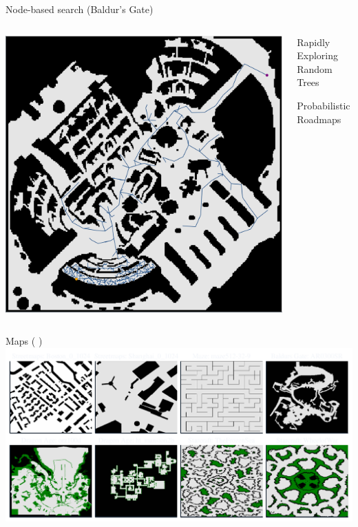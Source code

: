 \documentclass[aspectratio=169]{beamer}
\begin{document}
\begin{frame}[plain]{Node-based search (Baldur's Gate)}
  \begin{columns}[T]
      \begin{column}{.6\linewidth}
      \includegraphics[height=0.9\textheight, keepaspectratio]{figures/baldurs_rrt_one_off.pdf}
      \end{column}
      \begin{column}{.4\linewidth}
          \begin{vfilleditems}
              \item {\Large Rapidly Exploring Random Trees}
              \item {\Large Probabilistic Roadmaps}
          \end{vfilleditems}
      \end{column}
  \end{columns}
\end{frame}

\begin{frame}{Maps {\Medium \color{white}( \cite{sturtevant2012benchmarks})}}
    \includegraphics[width=1.0\linewidth, keepaspectratio]{figures/show_maps.pdf}
\end{frame}
\end{document}
